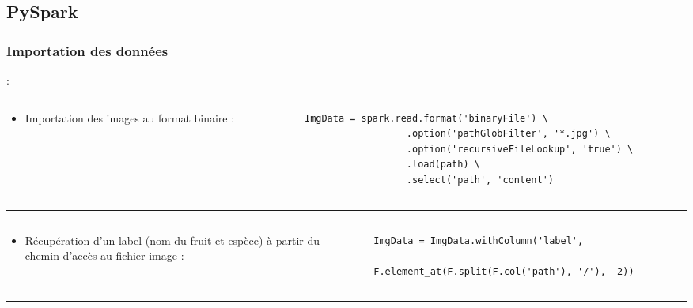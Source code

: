 \documentclass[8pt,aspectratio=169,hyperref={unicode=true}]{beamer}
\begin{document}
\subsection{PySpark}
\subsubsection{Importation des données}
\begin{frame}[fragile]{\insertsubsection : \insertsubsubsection}
  \begin{columns}
    \begin{column}{.25\textwidth}
      \begin{itemize}
        \item Importation des images au format binaire :
      \end{itemize}
    \end{column}
    \begin{column}{.75\textwidth}
      \begin{verbatim}
ImgData = spark.read.format('binaryFile') \
                  .option('pathGlobFilter', '*.jpg') \
                  .option('recursiveFileLookup', 'true') \
                  .load(path) \
                  .select('path', 'content')   
      \end{verbatim}
    \end{column}
  \end{columns}

  \vfill
  \hrule

  \begin{columns}
    \begin{column}{.25\textwidth}
      \begin{itemize}
        \item Récupération d'un label (nom du fruit et espèce) à partir du chemin d'accès au fichier image :
      \end{itemize}
    \end{column}
    \begin{column}{.75\textwidth}
      \begin{verbatim}
ImgData = ImgData.withColumn('label',
                             F.element_at(F.split(F.col('path'), '/'), -2))
      \end{verbatim}
    \end{column}
  \end{columns}

  \vfill
  \hrule


\end{frame}
\end{document}
